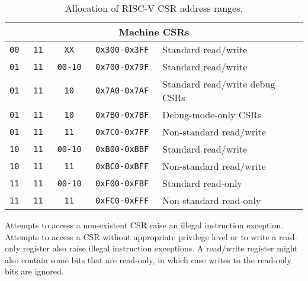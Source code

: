 \begin{table*}[h!]
\begin{center}
\begin{tabular}{|c|c|c|c|l|}
\hline
\multicolumn{5}{|c|}{Machine CSRs}  \\
\hline                                         
\tt   00   &\tt   11  &\tt   XX     & \tt 0x300-0x3FF & Standard read/write \\ 
\tt   01   &\tt   11  &\tt   00-10  & \tt 0x700-0x79F & Standard read/write \\ 
\tt   01   &\tt   11  &\tt   10     & \tt 0x7A0-0x7AF & Standard read/write debug CSRs  \\ 
\tt   01   &\tt   11  &\tt   10     & \tt 0x7B0-0x7BF & Debug-mode-only CSRs \\
\tt   01   &\tt   11  &\tt   11     & \tt 0x7C0-0x7FF & Non-standard read/write \\ 
\tt   10   &\tt   11  &\tt   00-10  & \tt 0xB00-0xBBF & Standard read/write \\ 
\tt   10   &\tt   11  &\tt   11     & \tt 0xBC0-0xBFF & Non-standard read/write \\ 
\tt   11   &\tt   11  &\tt   00-10  & \tt 0xF00-0xFBF & Standard read-only \\
\tt   11   &\tt   11  &\tt   11     & \tt 0xFC0-0xFFF & Non-standard read-only \\
\hline
\end{tabular}
\end{center}
\caption{Allocation of RISC-V CSR address ranges.}
\label{csrrwpriv}
\end{table*}

Attempts to access a non-existent CSR raise an illegal instruction
exception.  Attempts to access a CSR without appropriate privilege
level or to write a read-only register also raise illegal instruction
exceptions.  A read/write register might also contain some bits that
are read-only, in which case writes to the read-only bits are ignored.

